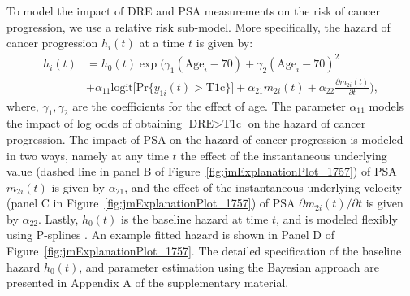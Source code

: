 To model the impact of DRE and PSA measurements on the risk of cancer progression, we use a relative risk sub-model. More specifically, the hazard of cancer progression $h_i(t)$ at a time $t$ is given by:
\begin{equation}
\label{eq:rel_risk_model}
\begin{split}
    h_i(t) &= h_0(t) \exp\Big(\gamma_1 (\mbox{Age}_i-70) + \gamma_2 (\mbox{Age}_i-70)^2\\
    &+\alpha_{11} \mbox{logit} \big[\mbox{Pr}\{y_{1i}(t) > \mbox{T1c}\}\big]+ \alpha_{21} m_{2i}(t) + \alpha_{22} \frac{\partial m_{2i}(t)}{\partial {t}}\Big),
    \end{split}
\end{equation}
where, $\gamma_1, \gamma_2$ are the coefficients for the effect of age. The parameter $\alpha_{11}$ models the impact of log odds of obtaining $\mbox{DRE} > \mbox{T1c}$ on the hazard of cancer progression. The impact of PSA on the hazard of cancer progression is modeled in two ways, namely at any time $t$ the effect of the instantaneous underlying value (dashed line in panel B of Figure~\ref{fig:jmExplanationPlot_1757}) of PSA $m_{2i}(t)$ is given by $\alpha_{21}$, and the effect of the instantaneous underlying velocity (panel C in Figure~\ref{fig:jmExplanationPlot_1757}) of PSA $\partial m_{2i}(t)/\partial {t}$ is given by $\alpha_{22}$. Lastly, $h_0(t)$ is the baseline hazard at time $t$, and is modeled flexibly using P-splines \citep{eilers1996flexible}. An example fitted hazard is shown in Panel D of Figure~\ref{fig:jmExplanationPlot_1757}. The detailed specification of the baseline hazard $h_0(t)$, and parameter estimation using the Bayesian approach are presented in Appendix A of the supplementary material.


